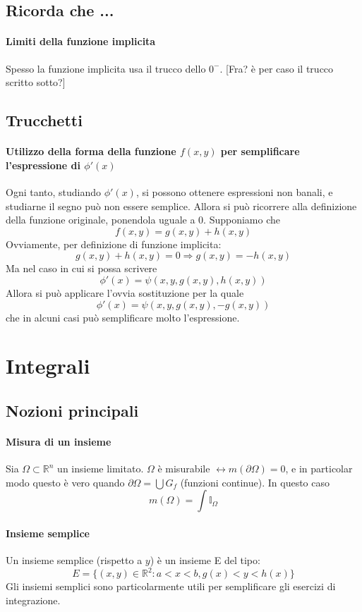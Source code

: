 \documentclass[a4paper,12pt]{book}
\begin{document}
\subsection{Ricorda che ...}
\paragraph{Limiti della funzione implicita}
Spesso la funzione implicita usa il trucco dello $0^-$. [Fra? è per caso il trucco scritto sotto?]

\subsection{Trucchetti}
\paragraph{Utilizzo della forma della funzione $f(x, y)$ per semplificare l'espressione di $\phi'(x)$}
Ogni tanto, studiando $\phi'(x)$, si possono ottenere espressioni non banali, e studiarne il segno può non essere semplice. Allora si può ricorrere alla definizione della funzione originale, ponendola uguale a 0. Supponiamo che
$$ f(x,y) = g(x,y)+h(x,y) $$
Ovviamente, per definizione di funzione implicita:
$$ g(x,y)+h(x,y) = 0 \Rightarrow g(x, y) = -h(x,y)$$
Ma nel caso in cui si possa scrivere
$$ \phi'(x) = \psi(x, y, g(x,y), h(x, y))$$
Allora si può applicare l'ovvia sostituzione per la quale
$$ \phi'(x) = \psi(x, y, g(x,y), -g(x, y))$$
che in alcuni casi può semplificare molto l'espressione.

\section{Integrali}
\subsection{Nozioni principali}
\paragraph{Misura di un insieme}
Sia $\Omega \subset \mathbb{R}^n$ un insieme limitato. $\Omega$ è misurabile $\leftrightarrow m(\partial\Omega) = 0$, e in particolar modo questo è vero quando $\partial\Omega = \bigcup G_f$ (funzioni continue).
In questo caso
$$m(\Omega) = \int \mathbb{I}_\Omega$$
\paragraph{Insieme semplice}
Un insieme semplice (rispetto a $y$) è un insieme E del tipo:
$$ E = \{(x, y) \in \mathbb{R}^2 : a<x<b, g(x)<y<h(x) \} $$
Gli insiemi semplici sono particolarmente utili per semplificare gli esercizi di integrazione.
\end{document}
